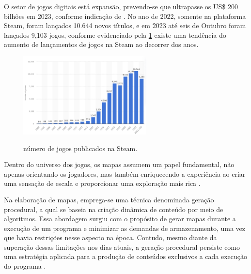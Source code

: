
O setor de jogos digitais está expansão, prevendo-se que ultrapasse os US\$ 200 bilhões em 2023, conforme indicação de . No ano de 2022, somente na plataforma Steam, foram lançados 10.644 novos títulos, e em 2023 até seis de Outubro foram lançados 9,103 jogos, conforme evidenciado pela \cref{fig:steam_publishes} existe uma tendência do aumento de lançamentos de jogos na Steam ao decorrer dos anos.


\begin{figure}[!ht]
	\centering
    \caption{número de jogos publicados na Steam.}
	\includegraphics[width=0.6\textwidth]{figures/steam_sales.png}
	\label{fig:steam_publishes}
\end{figure}

Dentro do universo dos jogos, os mapas assumem um papel fundamental, não apenas orientando os jogadores, mas também enriquecendo a experiência ao criar uma sensação de escala e proporcionar uma exploração mais rica \space\cite{video_game_maps, minimap}.

Na elaboração de mapas, emprega-se uma técnica denominada geração procedural, a qual se baseia na criação dinâmica de conteúdo por meio de algoritmos. Essa abordagem surgiu com o propósito de gerar mapas durante a execução de um programa e minimizar as demandas de armazenamento, uma vez que havia restrições nesse aspecto na época. Contudo, mesmo diante da superação dessas limitações nos dias atuais, a geração procedural persiste como uma estratégia aplicada para a produção de conteúdos exclusivos a cada execução do programa \cite{kenny2021procedural}.



